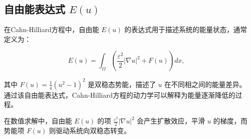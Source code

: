 \documentclass[12pt,a4paper]{article}
\begin{document}
	\subsection{自由能表达式 \( E(u) \)}
	
	在Cahn-Hilliard方程中，自由能 \( E(u) \) 的表达式用于描述系统的能量状态，通常定义为：
	
	\begin{equation}
		E(u) = \int_{\Omega} \left( \frac{\varepsilon^2}{2} |\nabla u|^2 + F(u) \right) dx,
	\end{equation}
	
	其中 \( F(u) = \frac{1}{4}(u^2 - 1)^2 \) 是双稳态势能，描述了 \( u \) 在不同相之间的能量差异。通过该自由能表达式，Cahn-Hilliard方程的动力学可以解释为能量逐渐降低的过程。
	
	在数值求解中，自由能 \( E(u) \) 的项 \( \frac{\varepsilon^2}{2} |\nabla u|^2 \) 会产生扩散效应，平滑 \( u \) 的梯度，而势能项 \( F(u) \) 则驱动系统向双稳态转变。
	
	
	
\end{document}
